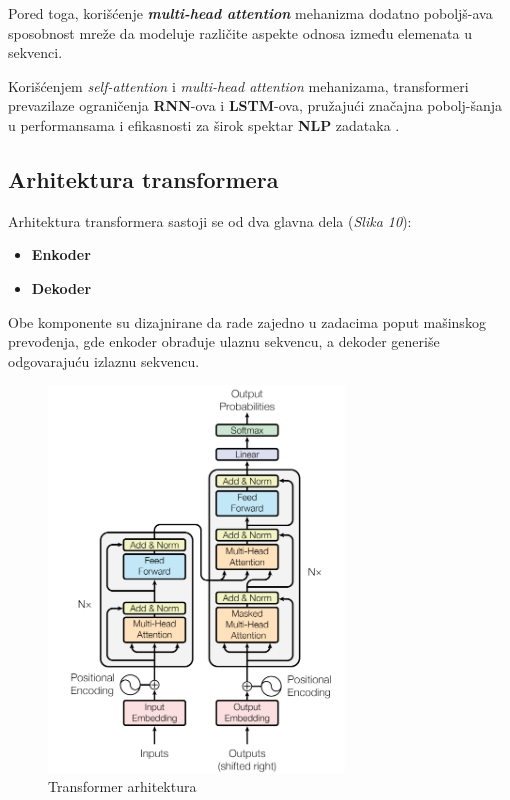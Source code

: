 \documentclass[12pt]{article}
\begin{document}
   Pored toga, korišćenje \textbf{\textit{multi-head attention}} mehanizma dodatno poboljš-ava 
   sposobnost mreže da modeluje različite aspekte odnosa između elemenata u sekvenci.

   Korišćenjem \textit{self-attention} i \textit{multi-head attention} mehanizama, transformeri 
   prevazilaze ograničenja \textbf{RNN}-ova i \textbf{LSTM}-ova, pružajući značajna 
   pobolj-šanja u performansama i efikasnosti za širok spektar \textbf{NLP} zadataka \cite{attentionneed}.

   \subsection{Arhitektura transformera}

   Arhitektura transformera sastoji se od dva glavna dela (\textit{Slika 10}):
   \begin{itemize}
      \item \textbf{Enkoder} 
      \item \textbf{Dekoder}
   \end{itemize}
   Obe komponente su dizajnirane da rade zajedno u zadacima poput mašinskog prevođenja, 
   gde enkoder obrađuje ulaznu sekvencu, a dekoder generiše odgovarajuću izlaznu sekvencu. 

   \newpage
   
   \begin{figure}[h!]
      \centering
      \vspace{-1cm} %
      \includegraphics[width=0.7\textwidth]{transformer.png}
      \caption{Transformer arhitektura \cite{attentionneed}}
      \label{fig:transformer}
   \end{figure}
\end{document}
